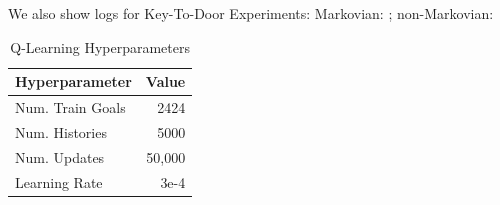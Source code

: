 \documentclass{article}
\begin{document}
We also show logs for Key-To-Door Experiments: Markovian: \href{https://wandb.ai/dunnolab/xminigrid-datasets?nw=jv26obunfp}{\color{blue}{wandb}}; non-Markovian: \href{https://wandb.ai/dunnolab/xminigrid-datasets?nw=gmm7b681xea}{\color{blue}{wandb}}


\begin{table}[h!]
\centering
\caption{Q-Learning Hyperparameters}
\label{table:q-learning-hypers}
\begin{tabular}{@{}lr@{}}
\toprule
Hyperparameter                  & Value \\ 
\midrule
Num. Train Goals                & 2424 \\
Num. Histories                  & 5000 \\
Num. Updates                    & 50,000 \\
Learning Rate                   & 3e-4 \\ \bottomrule
\end{tabular}
\end{table}

\end{document}
